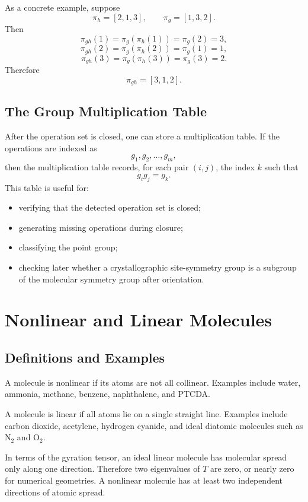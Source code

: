 \documentclass[11pt]{article}
\begin{document}
As a concrete example, suppose
\[
    \pi_h=[2,1,3],
    \qquad
    \pi_g=[1,3,2].
\]
Then
\[
    \pi_{gh}(1)=\pi_g(\pi_h(1))=\pi_g(2)=3,
\]
\[
    \pi_{gh}(2)=\pi_g(\pi_h(2))=\pi_g(1)=1,
\]
\[
    \pi_{gh}(3)=\pi_g(\pi_h(3))=\pi_g(3)=2.
\]
Therefore
\[
    \pi_{gh}=[3,1,2].
\]

\subsection{The Group Multiplication Table}

After the operation set is closed, one can store a multiplication table.  If the
operations are indexed as
\[
    g_1,g_2,\dots,g_m,
\]
then the multiplication table records, for each pair \((i,j)\), the index \(k\)
such that
\[
    g_i g_j = g_k.
\]
This table is useful for:
\begin{itemize}
    \item verifying that the detected operation set is closed;
    \item generating missing operations during closure;
    \item classifying the point group;
    \item checking later whether a crystallographic site-symmetry group is a
    subgroup of the molecular symmetry group after orientation.
\end{itemize}

\section{Nonlinear and Linear Molecules}

\subsection{Definitions and Examples}

A molecule is nonlinear if its atoms are not all collinear.  Examples include
water, ammonia, methane, benzene, naphthalene, and PTCDA.

A molecule is linear if all atoms lie on a single straight line.  Examples
include carbon dioxide, acetylene, hydrogen cyanide, and ideal diatomic
molecules such as \(\mathrm{N}_2\) and \(\mathrm{O}_2\).

In terms of the gyration tensor, an ideal linear molecule has molecular spread
only along one direction.  Therefore two eigenvalues of \(T\) are zero, or
nearly zero for numerical geometries.  A nonlinear molecule has at least two
independent directions of atomic spread.
\end{document}

